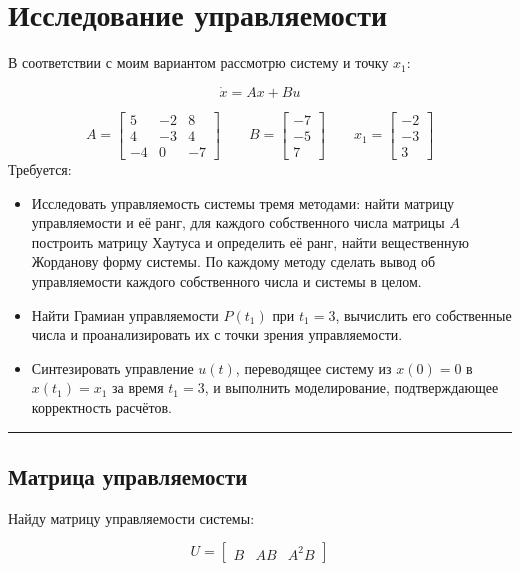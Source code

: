 \documentclass[a4paper,12pt]{article}
\begin{document}
	\newpage
	\tableofcontents
	
	
	\newpage
	\section{Исследование управляемости}
	\label{sec:task1}
	В соответствии с моим вариантом рассмотрю систему и точку \(x_1\):
	
	\[
	\dot{x} = A	x + B u 
	\]
	
	\[
	A = 
	\begin{bmatrix}
		5 & -2 & 8 \\
		4 & -3 & 4 \\
		-4 & 0 & -7
	\end{bmatrix}
	\qquad B = 
	\begin{bmatrix}
		-7 \\ -5 \\ 7
	\end{bmatrix}
	\qquad x_1 = 
	\begin{bmatrix}
		-2 \\ -3 \\ 3
	\end{bmatrix}
	\]
	Требуется:
	
	\begin{itemize}
		\item Исследовать управляемость системы тремя методами: найти матрицу 
		управляемости и её ранг, для каждого собственного числа матрицы $A$ 
		построить матрицу Хаутуса и определить её ранг, найти вещественную 
		Жорданову форму системы. По каждому методу сделать вывод об 
		управляемости каждого собственного числа и системы в целом.
		\item Найти Грамиан управляемости $P(t_1)$ при $t_1 = 3$, вычислить 
		его собственные числа и проанализировать их с точки зрения управляемости.
		\item Синтезировать управление $u(t)$, переводящее систему из 
		$x(0) = 0$ в $x(t_1) = x_1$ за время $t_1 = 3$, и выполнить 
		моделирование, подтверждающее корректность расчётов.
	\end{itemize}
	
	\hrule
	
	\newpage	
	\subsection{Матрица управляемости}
	
	Найду матрицу управляемости системы:
	
	\[
	U = 
	\begin{bmatrix}
		B & A B & A^2 B
	\end{bmatrix}
	\]
	
\end{document}
